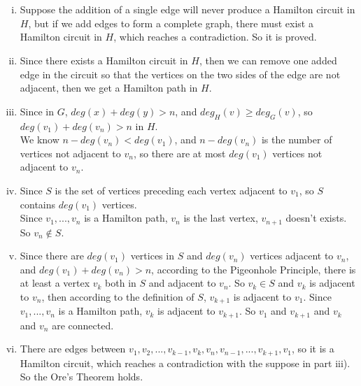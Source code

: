 \documentclass{article}
\begin{document}
\section{}
\begin{enumerate}[i)]
\item
Suppose the addition of a single edge will never produce a Hamilton circuit in $H$, but if we add edges to form a complete graph, there must exist a Hamilton circuit in $H$, which reaches a contradiction. So it is proved.
\item
Since there exists a Hamilton circuit in $H$, then we can remove one added edge in the circuit so that the vertices on the two sides of the edge are not adjacent, then we get a Hamilton path in $H$.
\item
Since in $G$, $deg(x)+deg(y)>n$, and $deg_H(v)\geqslant deg_G(v)$, so $deg(v_1)+deg(v_n)>n$ in $H$.\\
We know $n-deg(v_n)<deg(v_1)$, and $n-deg(v_n)$ is the number of vertices not adjacent to $v_n$, so there are at most $deg(v_1)$ vertices not adjacent to $v_n$.
\item
Since $S$ is the set of vertices preceding each vertex adjacent to $v_1$, so $S$ contains $deg(v_1)$ vertices.\\
Since $v_1,...,v_n$ is a Hamilton path, $v_n$ is the last vertex, $v_{n+1}$ doesn't exists. So $v_n\not\in S$.
\item
Since there are $deg(v_1)$ vertices in $S$ and $deg(v_n)$ vertices adjacent to $v_n$, and $deg(v_1)+deg(v_n)>n$, according to the Pigeonhole Principle, there is at least a vertex $v_k$ both in $S$ and adjacent to $v_n$. So $v_k\in S$ and $v_k$ is adjacent to $v_n$, then according to the definition of $S$, $v_{k+1}$ is adjacent to $v_1$. Since $v_1,...,v_n$ is a Hamilton path, $v_k$ is adjacent to $v_{k+1}$. So $v_1$ and $v_{k+1}$ and $v_k$ and $v_n$ are connected.
\item
There are edges between $v_1,v_2,...,v_{k-1},v_k,v_n,v_{n-1},...,v_{k+1},v_1$, so it is a Hamilton circuit, which reaches a contradiction with the suppose in part iii). So the Ore's Theorem holds.
\end{enumerate}


\section{}

\end{document}
